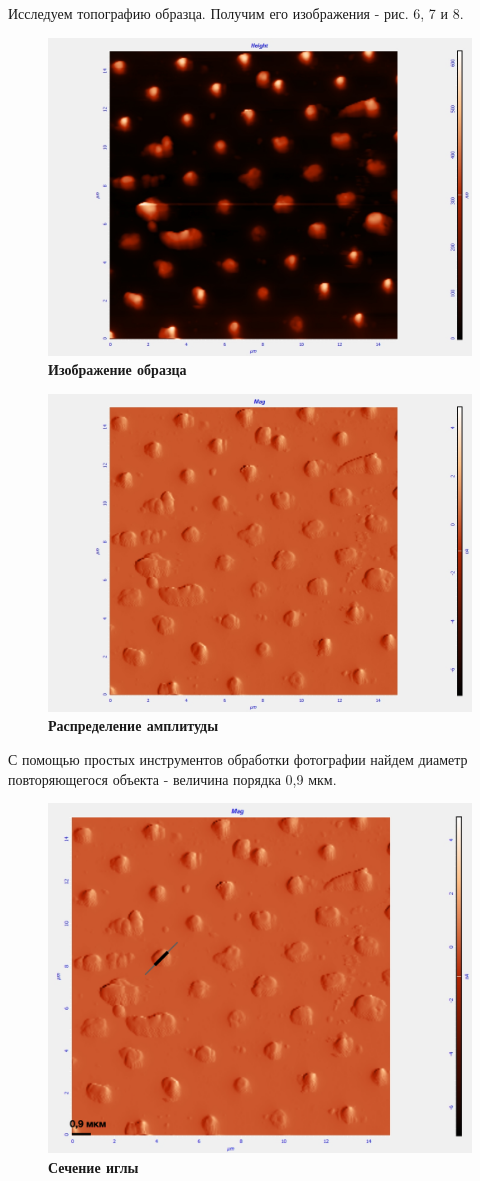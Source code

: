 \documentclass[a4paper]{article}
\begin{document}
Исследуем топографию образца. Получим его изображения - рис. 6, 7 и 8.
 \begin{figure}[H]
\centering
	\includegraphics[width=0.8\linewidth]{ph1.jpg}
		\caption{{\bf {Изображение образца}}}
   	\label{fig:6}
\end{figure}
 \begin{figure}[H]
\centering
	\includegraphics[width=0.8\linewidth]{ph2.jpg}
		\caption{{\bf {Распределение амплитуды}}}
   	\label{fig:7}
\end{figure}

С помощью простых инструментов обработки фотографии найдем диаметр повторяющегося объекта - величина порядка 0,9 мкм.
 \begin{figure}[H]
\centering
	\includegraphics[width=0.6\linewidth]{anal.png}
		\caption{{\bf {Сечение иглы}}}
   	\label{fig:8}
\end{figure}
\end{document}
